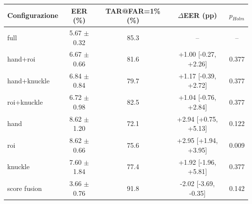\begin{tabular}{lcccc}
\toprule
Configurazione & EER (\%) & TAR@FAR=1\% (\%) & $\Delta$EER (pp) & $p_{Holm}$ \\
\midrule
full & 5.67 $\pm$ 0.32 & 85.3 & -- & -- \\
hand+roi & 6.67 $\pm$ 0.66 & 81.6 & +1.00 [-0.27, +2.26] & 0.377 \\
hand+knuckle & 6.84 $\pm$ 0.84 & 79.7 & +1.17 [-0.39, +2.72] & 0.377 \\
roi+knuckle & 6.72 $\pm$ 0.98 & 82.5 & +1.04 [-0.76, +2.84] & 0.377 \\
hand & 8.62 $\pm$ 1.20 & 72.1 & +2.94 [+0.75, +5.13] & 0.122 \\
roi & 8.62 $\pm$ 0.66 & 75.6 & +2.95 [+1.94, +3.95] & 0.009 \\
knuckle & 7.60 $\pm$ 1.84 & 77.4 & +1.92 [-1.96, +5.81] & 0.377 \\
score fusion & 3.66 $\pm$ 0.76 & 91.8 & -2.02 [-3.69, -0.35] & 0.142 \\
\bottomrule
\end{tabular}